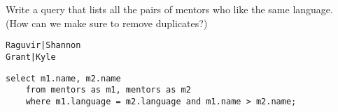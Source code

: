 \begin{blocksection}
\question Write a query that lists all the pairs of mentors who like the same language. (How can we make sure to remove duplicates?)

\begin{lstlisting}
Raguvir|Shannon
Grant|Kyle
\end{lstlisting}

\begin{solution}[1in]
\begin{lstlisting}
select m1.name, m2.name
    from mentors as m1, mentors as m2
    where m1.language = m2.language and m1.name > m2.name;
\end{lstlisting}
\end{solution}
\end{blocksection}
